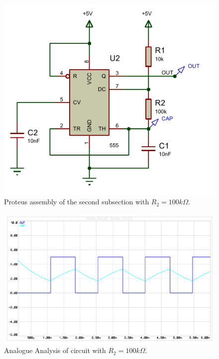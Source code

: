 \begin{figure}[H]
    \centering
    \includegraphics[scale = 1.1]{Graphics/VHDL/Practice 2/GRAPHICS/555/GRAPHS/PROTEUS/ASSEMBLY/555_ASTABLE_100K_ASSEMBLY.PDF}
    \caption{Proteus assembly of the second subsection with $R_2 = 100k \Omega$.}
    \label{fig:555_ASTABLE_100K_ASSEMBLY}
\end{figure}

\begin{figure}[H]
    \centering
    \includegraphics[scale = 0.75]{Graphics/VHDL/Practice 2/GRAPHICS/555/GRAPHS/PROTEUS/ANALOGUE/555_ASTABLE_ANALOGUE_100K.PDF}
    \caption{Analogue Analysis of circuit with $R_2 = 100k \Omega$.}
    \label{fig:555_ASTABLE_ANALOGUE_100K}
\end{figure}

